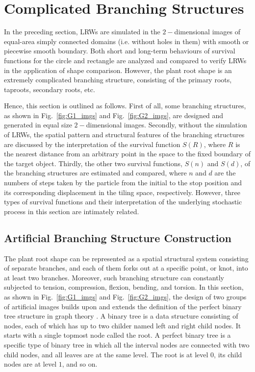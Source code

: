 \section{Complicated Branching Structures}


In the preceding section, LRWs are simulated in the $2-$dimensional
images of equal-area simply connected domains (i.e. without holes in
them) with smooth or piecewise smooth boundary. Both short and
long-term behaviours of survival functions for the circle and
rectangle are analyzed and compared to verify LRWs in the application
of shape comparison. However, the plant root shape is an extremely
complicated branching structure, consisting of the primary roots,
taproots, secondary roots, etc. 

Hence, this section is outlined as follows. First of all, some
branching structures, as shown in Fig.~\ref{fig:G1_imgs} and
Fig.~\ref{fig:G2_imgs}, are designed and generated in equal size
$2-$dimensional images. Secondly, without the simulation of LRWs, the
spatial pattern and structural features of the branching structures
are discussed by the interpretation of the survival function $S(R)$,
where $R$ is the nearest distance from an arbitrary point in the space
to the fixed boundary of the target object. Thirdly, the other two
survival functions, $S(n)$ and $S(d)$, of the branching structures are
estimated and compared, where $n$ and $d$ are the numbers of steps
taken by the particle from the initial to the stop position and its
corresponding displacement in the tiling space, respectively. However,
three types of survival functions and their interpretation of the
underlying stochastic process in this section are intimately related.



\subsection{Artificial Branching Structure Construction}


The plant root shape can be represented as a spatial structural system
consisting of separate branches, and each of them forks out at a
specific point, or knot, into at least two branches.  Moreover, such
branching structure can constantly subjected to tension, compression,
flexion, bending, and torsion.  In this section, as shown in
Fig.~\ref{fig:G1_imgs} and Fig.~\ref{fig:G2_imgs}, the design of two
groups of artificial images builds upon and extends the definition of
the perfect binary tree structure \cite{rosen1999discrete} in graph
theory \cite{west2001introduction}. A binary tree is a data structure
consisting of nodes, each of which has up to two childer named left
and right child nodes. It starts with a single topmost node called the
root. A perfect binary tree is a specific type of binary tree in which
all the interval nodes are connected with two child nodes, and all
leaves are at the same level. The root is at level $0$, its child
nodes are at level $1$, and so on.




